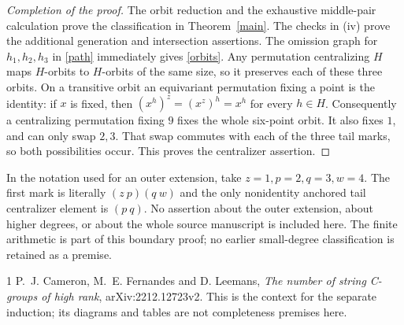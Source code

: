 \documentclass[11pt]{article}
\begin{document}
\begin{proof}[Completion of the proof]
The orbit reduction and the exhaustive middle-pair calculation prove the
classification in Theorem~\ref{main}. The checks in (iv) prove the additional
generation and intersection assertions. The omission graph for
$h_1,h_2,h_3$ in \eqref{path} immediately gives \eqref{orbits}.
Any permutation centralizing $H$ maps $H$-orbits to $H$-orbits of the same
size, so it preserves each of these three orbits. On a transitive orbit an
equivariant permutation fixing a point is the identity: if $x$ is fixed,
then $(x^h)^z=(x^z)^h=x^h$ for every $h\in H$. Consequently a centralizing
permutation fixing $9$ fixes the whole six-point orbit. It also fixes $1$,
and can only swap $2,3$. That swap commutes with each of the three tail marks,
so both possibilities occur. This proves the centralizer assertion.
\end{proof}

\noindent In the notation used for an outer extension, take
$z=1,p=2,q=3,w=4$. The first mark is literally $(z\ p)(q\ w)$ and the only
nonidentity anchored tail centralizer element is $(p\ q)$. No assertion
about the outer extension, about higher degrees, or about the whole source
manuscript is included here. The finite arithmetic is part of this boundary
proof; no earlier small-degree classification is retained as a premise.

\begin{thebibliography}{1}
 P.~J. Cameron, M.~E. Fernandes and D. Leemans,
\emph{The number of string C-groups of high rank},
arXiv:2212.12723v2. This is the context for the separate induction;
its diagrams and tables are not completeness premises here.
\end{thebibliography}
\end{document}
